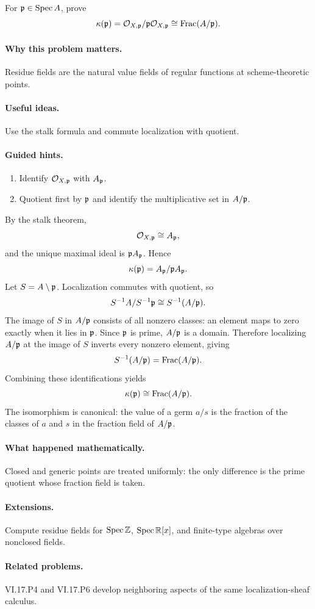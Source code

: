\begin{problem}\label{prob:vi17-p05}
For $\mathfrak p\in\operatorname{Spec} A$, prove
\[\kappa(\mathfrak p)=\mathcal O_{X,\mathfrak p}/\mathfrak p\mathcal O_{X,\mathfrak p}\cong\operatorname{Frac}(A/\mathfrak p).\]
\end{problem}

\ifdefined\FullProblemDossiers
\paragraph{Why this problem matters.}
Residue fields are the natural value fields of regular functions at scheme-theoretic points.

\paragraph{Useful ideas.}
Use the stalk formula and commute localization with quotient.

\paragraph{Guided hints.}
\begin{enumerate}
\item Identify $\mathcal O_{X,\mathfrak p}$ with $A_{\mathfrak p}$.
\item Quotient first by $\mathfrak p$ and identify the multiplicative set in $A/\mathfrak p$.
\end{enumerate}

\begin{solution}
By the stalk theorem,
\[
\mathcal O_{X,\mathfrak p}\cong A_{\mathfrak p},
\]
and the unique maximal ideal is $\mathfrak p A_{\mathfrak p}$.  Hence
\[
\kappa(\mathfrak p)=A_{\mathfrak p}/\mathfrak p A_{\mathfrak p}.
\]
Let $S=A\setminus\mathfrak p$.  Localization commutes with quotient, so
\[
S^{-1}A/S^{-1}\mathfrak p
\cong
S^{-1}(A/\mathfrak p).
\]
The image of $S$ in $A/\mathfrak p$ consists of all nonzero classes: an element maps to zero exactly when it lies in $\mathfrak p$.  Since $\mathfrak p$ is prime, $A/\mathfrak p$ is a domain.  Therefore localizing $A/\mathfrak p$ at the image of $S$ inverts every nonzero element, giving
\[
S^{-1}(A/\mathfrak p)=\operatorname{Frac}(A/\mathfrak p).
\]
Combining these identifications yields
\[
\kappa(\mathfrak p)\cong\operatorname{Frac}(A/\mathfrak p).
\]
The isomorphism is canonical: the value of a germ $a/s$ is the fraction of the classes of $a$ and $s$ in the fraction field of $A/\mathfrak p$.
\end{solution}



\paragraph{What happened mathematically.}
Closed and generic points are treated uniformly: the only difference is the prime quotient whose fraction field is taken.

\paragraph{Extensions.}
Compute residue fields for $\operatorname{Spec}\mathbb Z$, $\operatorname{Spec}\mathbb R[x]$, and finite-type algebras over nonclosed fields.

\paragraph{Related problems.}
VI.17.P4 and VI.17.P6 develop neighboring aspects of the same localization-sheaf calculus.
\fi
